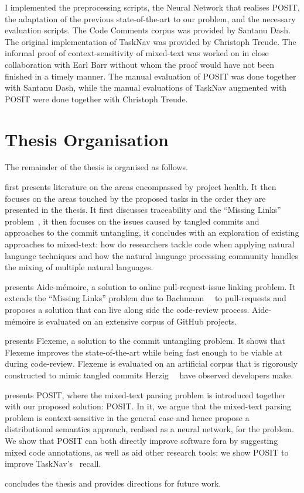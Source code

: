 \begin{itemize}[leftmargin=*]
    \noindent I implemented the preprocessing scripts, the Neural Network
    that realises POSIT, the adaptation of the previous state-of-the-art to our
    problem, and the necessary evaluation scripts. The Code Comments corpus was
    provided by Santanu Dash. The original implementation of TaskNav was
    provided by Christoph Treude. The informal proof of context-sensitivity of
    mixed-text was worked on in close collaboration with Earl Barr without whom
    the proof would have not been finished in a timely manner. The manual
    evaluation of POSIT was done together with Santanu Dash, while the manual
    evaluations of TaskNav augmented with POSIT were done together with
    Christoph Treude.
\end{itemize}

\section{Thesis Organisation}
\label{chapter:introduction:sec:organisation}

The remainder of the thesis is organised as follows.

 first presents literature on the areas encompassed by
project health. It then focuses on the areas touched by the proposed tasks in
the order they are presented in the thesis. It first discusses traceability and
the ``Missing Links'' problem~\cite{MissingLinks}, it then focuses on the issues
caused by tangled commits and approaches to the commit untangling, it concludes
with an exploration of existing approaches to mixed-text: how do researchers
tackle code when applying natural language techniques and how the natural
language processing community handles the mixing of multiple natural languages.

 presents Aide-mémoire, a solution to online pull-request-issue
linking problem. It extends the ``Missing Links'' problem due to
Bachmann~\etal~\cite{MissingLinks} to pull-requests and proposes a solution that
can live along side the code-review process. Aide-mémoire is evaluated on an
extensive corpus of GitHub projects.

 presents Flexeme, a solution to the commit untangling
problem. It shows that Flexeme improves the state-of-the-art while being fast
enough to be viable at during code-review. Flexeme is evaluated on an artificial
corpus that is rigorously constructed to mimic tangled commits
Herzig~\etal~\cite{Herzig2016} have observed developers make.

 presents POSIT, where the mixed-text parsing problem is
introduced together with our proposed solution: POSIT. In it, we argue that the
mixed-text parsing problem is context-sensitive in the general case and hence
propose a distributional semantics approach, realised as a neural network, for
the problem. We show that POSIT can both directly improve software fora by
suggesting mixed code annotations, as well as aid other research tools: we show
POSIT to improve TaskNav's~\cite{Treude:2015:TTN:2819009.2819128} recall.

 concludes the thesis and provides directions for
future work.